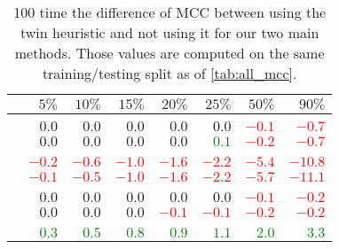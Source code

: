 \begin{table}[htpb]
  \centering
  \caption{100 time the difference of MCC between using the twin heuristic and not using it for our
  two main methods. Those values are computed on the same training/testing split as of
\autoref{tab:all_mcc}.\label{tab:twin}}
  \begin{tabular}{lrrrrrrr}
    \toprule
                                & $5\%$                    & $10\%$                   & $15\%$                   & $20\%$                   & $25\%$                   & $50\%$                   & $90\%$                   \\
    \midrule
    \multicolumn{8}{c}{\aut{}} \\
    \uslpropGsecTwin{}          & $0.0$                    & $0.0$                    & $0.0$                    & $0.0$                    & $0.0$                    & \textcolor{Red}{$-0.1$}  & \textcolor{Red}{$-0.7$}  \\
    \usruleTwin{}               & $0.0$                    & $0.0$                    & $0.0$                    & $0.0$                    & \textcolor{Green}{$0.1$} & \textcolor{Red}{$-0.2$}  & \textcolor{Red}{$-0.7$}  \\
    \multicolumn{8}{c}{\adv{}} \\
    \uslpropGsecTwin{}          & \textcolor{Red}{$-0.2$}  & \textcolor{Red}{$-0.6$}  & \textcolor{Red}{$-1.0$}  & \textcolor{Red}{$-1.6$}  & \textcolor{Red}{$-2.2$}  & \textcolor{Red}{$-5.4$}  & \textcolor{Red}{$-10.8$} \\
    \usruleTwin{}               & \textcolor{Red}{$-0.1$}  & \textcolor{Red}{$-0.5$}  & \textcolor{Red}{$-1.0$}  & \textcolor{Red}{$-1.6$}  & \textcolor{Red}{$-2.2$}  & \textcolor{Red}{$-5.7$}  & \textcolor{Red}{$-11.1$} \\
    \multicolumn{8}{c}{\wik{}} \\
    \uslpropGsecTwin{}          & $0.0$                    & $0.0$                    & $0.0$                    & $0.0$                    & $0.0$                    & \textcolor{Red}{$-0.1$}  & \textcolor{Red}{$-0.2$}  \\
    \usruleTwin{}               & $0.0$                    & $0.0$                    & $0.0$                    & \textcolor{Red}{$-0.1$}  & \textcolor{Red}{$-0.1$}  & \textcolor{Red}{$-0.2$}  & \textcolor{Red}{$-0.2$}  \\
    \multicolumn{8}{c}{\sla{}} \\
    \uslpropGsecTwin{}          & \textcolor{Green}{$0.3$} & \textcolor{Green}{$0.5$} & \textcolor{Green}{$0.8$} & \textcolor{Green}{$0.9$} & \textcolor{Green}{$1.1$} & \textcolor{Green}{$2.0$} & \textcolor{Green}{$3.3$} \\

\end{tabular}
\end{table}

